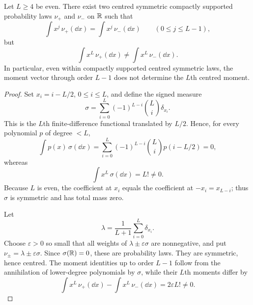 \begin{lemma}%
\label{lem:lower-moment-realizability-obstruction}
Let \(L\ge4\) be even.  There exist two centred symmetric compactly
supported probability laws \(\nu_+\) and \(\nu_-\) on \(\mathbb{R}\) such that
\[
  \int x^j\,\nu_+(\dd x)=\int x^j\,\nu_-(\dd x)
  \qquad(0\le j\le L-1),
\]
but
\[
  \int x^L\,\nu_+(\dd x)\ne \int x^L\,\nu_-(\dd x).
\]
In particular, even within compactly supported centred symmetric laws, the
moment vector through order \(L-1\) does not determine the \(L\)th centred
moment.
\end{lemma}

\ifdefined\JFAArticleMain
{}
\else
\begin{proof}
Set \(x_i=i-L/2\), \(0\le i\le L\), and define the signed measure
\[
  \sigma=\sum_{i=0}^{L}(-1)^{L-i}\binom{L}{i}\delta_{x_i}.
\]
This is the \(L\)th finite-difference functional translated by \(L/2\).
Hence, for every polynomial \(p\) of degree \(<L\),
\[
  \int p(x)\,\sigma(\dd x)
  =\sum_{i=0}^{L}(-1)^{L-i}\binom{L}{i}p(i-L/2)=0,
\]
whereas
\[
  \int x^L\,\sigma(\dd x)=L!\ne0 .
\]
Because \(L\) is even, the coefficient at \(x_i\) equals the coefficient at
\(-x_i=x_{L-i}\); thus \(\sigma\) is symmetric and has total mass zero.

Let
\[
  \lambda=\frac1{L+1}\sum_{i=0}^{L}\delta_{x_i}.
\]
Choose \(\varepsilon>0\) so small that all weights of
\(\lambda\pm\varepsilon\sigma\) are nonnegative, and put
\(\nu_\pm=\lambda\pm\varepsilon\sigma\).  Since \(\sigma(\mathbb{R})=0\), these are
probability laws.  They are symmetric, hence centred.  The moment identities
up to order \(L-1\) follow from the annihilation of lower-degree
polynomials by \(\sigma\), while their \(L\)th moments differ by
\[
  \int x^L\,\nu_+(\dd x)-\int x^L\,\nu_-(\dd x)
  =2\varepsilon L!\ne0 .
\]
\end{proof}
\fi


